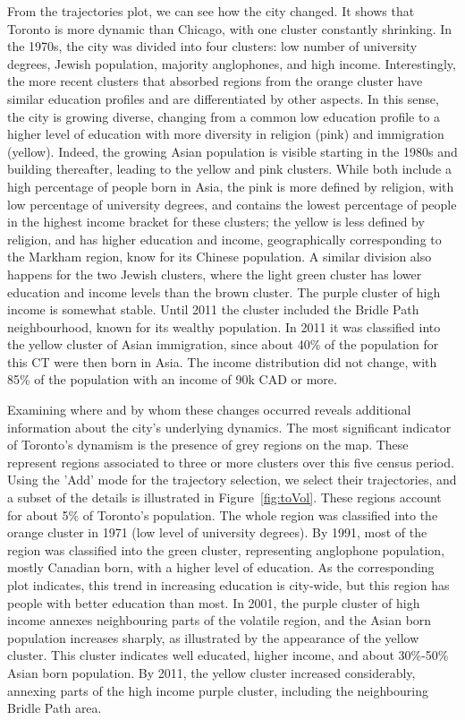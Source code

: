 From the trajectories plot, we can see how the city changed. It shows that
Toronto is more dynamic than Chicago, with one cluster constantly shrinking. In
the 1970s, the city was divided into four clusters: low number of university
degrees, Jewish population, majority anglophones, and high income.
Interestingly, the more recent clusters that absorbed regions from the orange
cluster have similar education profiles and are differentiated by other aspects.
In this sense, the city is growing diverse, changing from a common low education
profile to a higher level of education with more diversity in religion (pink)
and immigration (yellow). Indeed, the growing Asian population is visible
starting in the 1980s and building thereafter, leading to the yellow and pink
clusters. While both include a high percentage of people born in Asia, the pink
is more defined by religion, with low percentage of university degrees, and
contains the lowest percentage of people in the highest income bracket for these
clusters; the yellow is less defined by religion, and has higher education and
income, geographically corresponding to the Markham region, know for its Chinese
population. A similar division also happens for the two Jewish clusters, where
the light green cluster has lower education and income levels than the brown
cluster. The purple cluster of high income is somewhat stable. Until 2011 the
cluster included the Bridle Path neighbourhood, known for its wealthy
population. In 2011 it was classified into the yellow cluster of Asian
immigration, since about 40\% of the population for this CT were then born in
Asia. The income distribution did not change, with 85\% of the population with
an income of 90k CAD or more.


Examining where and by whom these changes occurred reveals additional
information about the city's underlying dynamics. The most significant indicator
of Toronto's dynamism is the presence of grey regions on the map. These
represent regions associated to three or more clusters over this five census
period. Using the 'Add' mode for the trajectory selection, we select their
trajectories, and a subset of the details is illustrated in
Figure~\ref{fig:toVol}. These regions account for about 5\% of Toronto's
population. The whole region was classified into the orange cluster in 1971 (low
level of university degrees). By 1991, most of the region was classified into
the green cluster, representing anglophone population, mostly Canadian born,
with a higher level of education. As the corresponding plot indicates, this
trend in increasing education is city-wide, but this region has people with
better education than most. In 2001, the purple cluster of high income annexes
neighbouring parts of the volatile region, and the Asian born population
increases sharply, as illustrated by the appearance of the yellow cluster.  This
cluster indicates well educated, higher income, and about 30\%-50\% Asian born
population. By 2011, the yellow cluster increased considerably, annexing parts
of the high income purple cluster, including the neighbouring Bridle Path area.

